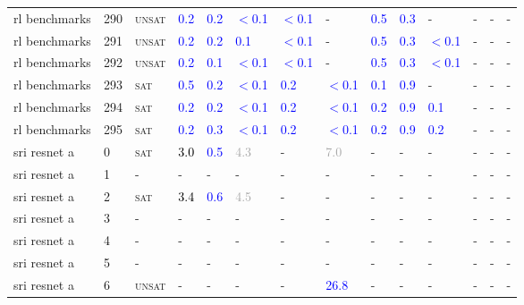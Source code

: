 \begin{center}
{\begin{longtable}{@{}llllllllllllll@{}}
rl benchmarks & 290 & \textsc{unsat} & \textcolor{blue}{0.2} & \textcolor{blue}{0.2} & \textcolor{blue}{$<$0.1} & \textcolor{blue}{$<$0.1} & - & \textcolor{blue}{0.5} & \textcolor{blue}{0.3} & - & - & - & - \\
rl benchmarks & 291 & \textsc{unsat} & \textcolor{blue}{0.2} & \textcolor{blue}{0.2} & \textcolor{blue}{0.1} & \textcolor{blue}{$<$0.1} & - & \textcolor{blue}{0.5} & \textcolor{blue}{0.3} & \textcolor{blue}{$<$0.1} & - & - & - \\
rl benchmarks & 292 & \textsc{unsat} & \textcolor{blue}{0.2} & \textcolor{blue}{0.1} & \textcolor{blue}{$<$0.1} & \textcolor{blue}{$<$0.1} & - & \textcolor{blue}{0.5} & \textcolor{blue}{0.3} & \textcolor{blue}{$<$0.1} & - & - & - \\
rl benchmarks & 293 & \textsc{sat} & \textcolor{blue}{0.5} & \textcolor{blue}{0.2} & \textcolor{blue}{$<$0.1} & \textcolor{blue}{0.2} & \textcolor{blue}{$<$0.1} & \textcolor{blue}{0.1} & \textcolor{blue}{0.9} & - & - & - & - \\
rl benchmarks & 294 & \textsc{sat} & \textcolor{blue}{0.2} & \textcolor{blue}{0.2} & \textcolor{blue}{$<$0.1} & \textcolor{blue}{0.2} & \textcolor{blue}{$<$0.1} & \textcolor{blue}{0.2} & \textcolor{blue}{0.9} & \textcolor{blue}{0.1} & - & - & - \\
rl benchmarks & 295 & \textsc{sat} & \textcolor{blue}{0.2} & \textcolor{blue}{0.3} & \textcolor{blue}{$<$0.1} & \textcolor{blue}{0.2} & \textcolor{blue}{$<$0.1} & \textcolor{blue}{0.2} & \textcolor{blue}{0.9} & \textcolor{blue}{0.2} & - & - & - \\
sri resnet a & 0 & \textsc{sat} & \textcolor{black}{3.0} & \textcolor{blue}{0.5} & \textcolor{darkgray}{4.3} & - & \textcolor{darkgray}{7.0} & - & - & - & - & - & - \\
sri resnet a & 1 & - & - & - & - & - & - & - & - & - & - & - & - \\
sri resnet a & 2 & \textsc{sat} & \textcolor{black}{3.4} & \textcolor{blue}{0.6} & \textcolor{darkgray}{4.5} & - & - & - & - & - & - & - & - \\
sri resnet a & 3 & - & - & - & - & - & - & - & - & - & - & - & - \\
sri resnet a & 4 & - & - & - & - & - & - & - & - & - & - & - & - \\
sri resnet a & 5 & - & - & - & - & - & - & - & - & - & - & - & - \\
sri resnet a & 6 & \textsc{unsat} & - & - & - & - & \textcolor{blue}{26.8} & - & - & - & - & - & - \\

\end{longtable}}
\end{center}
